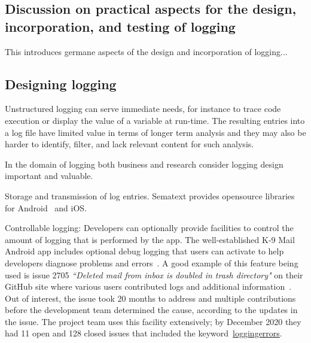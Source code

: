 \subsection{Discussion on practical aspects for the design, incorporation, and testing of logging} \label{apx:practical-aspects-for-design-and-incorporation-of-logging}
This introduces germane aspects of the design and incorporation of logging...



\subsection{Designing logging}
Unstructured logging can serve immediate needs, for instance to trace code execution or display the value of a variable at run-time. The resulting entries into a log file have limited value in terms of longer term analysis and they may also be harder to identify, filter, and lack relevant content for such analysis.

In the domain of logging both business and research consider logging design important and valuable. 

Storage and transmission of log entries. Sematext provides opensource libraries for Android~\citep{github2020_sematext_logsene_android} and iOS.

Controllable logging: Developers can optionally provide facilities to control the amount of logging that is performed by the app. The well-established K-9 Mail Android app includes optional debug logging that users can activate to help developers diagnose problems and errors~\citep{github2020_k9mail_logging_errors}. A good example of this feature being used is issue 2705 \emph{``Deleted mail from inbox is doubled in trash directory"} on their GitHub site where various users contributed logs and additional information~\citep{github2017_k9mail_issue_2705}. Out of interest, the issue took 20 months to address and multiple contributions before the development team determined the cause, according to the updates in the issue. The project team uses this facility extensively; by  December 2020 they had 11 open and 128 closed issues that included the keyword~\href{https://github.com/k9mail/k-9/issues?utf8=\%E2\%9C\%93\&q=is\%3Aissue\%20is\%3Aopen\%20loggingerrors\%20}{loggingerrors}.

